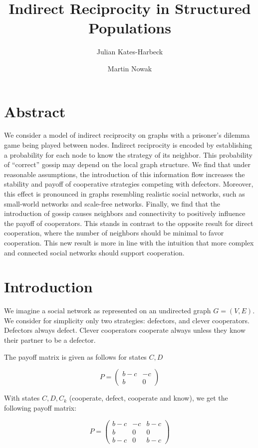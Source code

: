 \documentclass{article}
\title{Indirect Reciprocity in Structured Populations}
\author{Julian Kates-Harbeck \and Martin Nowak}
\renewcommand{\=}[1]{\stackrel{#1}{=}} %
\begin{document}
    
    
    \maketitle
    

    \section{Abstract}


    We consider a model of indirect reciprocity on graphs with a prisoner's
dilemma game being played between nodes. Indirect reciprocity is encoded
by establishing a probability for each node to know the strategy of its
neighbor. This probability of ``correct'' gossip may depend on the local
graph structure. We find that under reasonable assumptions, the
introduction of this information flow increases the stability and payoff
of cooperative strategies competing with defectors. Moreover, this
effect is pronounced in graphs resembling realistic social networks,
such as small-world networks and scale-free networks. Finally, we find
that the introduction of gossip causes neighbors and connectivity to
positively influence the payoff of cooperators. This stands in contrast
to the opposite result for direct cooperation, where the number of
neighbors should be minimal to favor cooperation. This new result is
more in line with the intuition that more complex and connected social
networks should support cooperation.


    \section{Introduction}


    We imagine a social network as represented on an undirected graph
$G = (V,E)$. We consider for simplicity only two strategies: defectors,
and clever cooperators. Defectors always defect. Clever cooperators
cooperate always unless they know their partner to be a defector.

The payoff matrix is given as follows for states $C,D$

\[P = \begin{pmatrix} b - c & -c \\ b & 0\end{pmatrix}\]

With states $C,D,C_k$ (cooperate, defect, cooperate and know), we get
the following payoff matrix:

\[P = \begin{pmatrix} b - c & -c & b-c \\ b & 0 & 0 \\ b - c& 0 & b - c\end{pmatrix}\]
\end{document}

